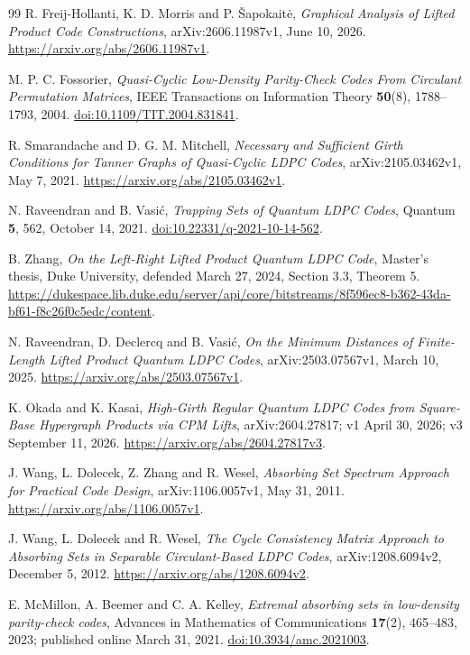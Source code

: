 \documentclass[11pt]{article}
\theoremstyle{definition}
\theoremstyle{remark}
\begin{document}
\begin{thebibliography}{99}
R. Freij-Hollanti, K. D. Morris and P. \v Sapokait\.{e},
\emph{Graphical Analysis of Lifted Product Code Constructions},
arXiv:2606.11987v1, June 10, 2026.
\url{https://arxiv.org/abs/2606.11987v1}.

M. P. C. Fossorier,
\emph{Quasi-Cyclic Low-Density Parity-Check Codes From Circulant Permutation Matrices},
IEEE Transactions on Information Theory \textbf{50}(8), 1788--1793, 2004.
\href{https://doi.org/10.1109/TIT.2004.831841}{doi:10.1109/TIT.2004.831841}.

R. Smarandache and D. G. M. Mitchell,
\emph{Necessary and Sufficient Girth Conditions for Tanner Graphs of Quasi-Cyclic LDPC Codes},
arXiv:2105.03462v1, May 7, 2021.
\url{https://arxiv.org/abs/2105.03462v1}.

N. Raveendran and B. Vasi\'c,
\emph{Trapping Sets of Quantum LDPC Codes}, Quantum \textbf{5}, 562, October 14, 2021.
\href{https://doi.org/10.22331/q-2021-10-14-562}{doi:10.22331/q-2021-10-14-562}.

B. Zhang, \emph{On the Left-Right Lifted Product Quantum LDPC Code},
Master's thesis, Duke University, defended March 27, 2024, Section 3.3, Theorem 5.
\url{https://dukespace.lib.duke.edu/server/api/core/bitstreams/8f596ec8-b362-43da-bf61-f8c26f0c5edc/content}.

N. Raveendran, D. Declercq and B. Vasi\'c,
\emph{On the Minimum Distances of Finite-Length Lifted Product Quantum LDPC Codes},
arXiv:2503.07567v1, March 10, 2025.
\url{https://arxiv.org/abs/2503.07567v1}.

K. Okada and K. Kasai,
\emph{High-Girth Regular Quantum LDPC Codes from Square-Base Hypergraph Products via CPM Lifts},
arXiv:2604.27817; v1 April 30, 2026; v3 September 11, 2026.
\url{https://arxiv.org/abs/2604.27817v3}.

J. Wang, L. Dolecek, Z. Zhang and R. Wesel,
\emph{Absorbing Set Spectrum Approach for Practical Code Design},
arXiv:1106.0057v1, May 31, 2011.
\url{https://arxiv.org/abs/1106.0057v1}.

J. Wang, L. Dolecek and R. Wesel,
\emph{The Cycle Consistency Matrix Approach to Absorbing Sets in Separable Circulant-Based LDPC Codes},
arXiv:1208.6094v2, December 5, 2012.
\url{https://arxiv.org/abs/1208.6094v2}.

E. McMillon, A. Beemer and C. A. Kelley,
\emph{Extremal absorbing sets in low-density parity-check codes},
Advances in Mathematics of Communications \textbf{17}(2), 465--483, 2023;
published online March 31, 2021.
\href{https://doi.org/10.3934/amc.2021003}{doi:10.3934/amc.2021003}.


\end{thebibliography}
\end{document}
